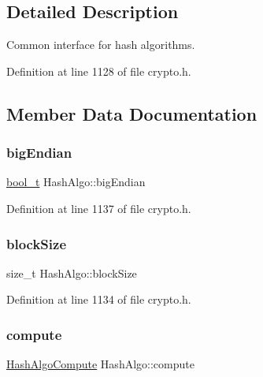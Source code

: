 \subsection{Detailed Description}
Common interface for hash algorithms. 

Definition at line 1128 of file crypto.\+h.



\subsection{Member Data Documentation}
\mbox{\label{structHashAlgo_ad3de1766a80c361da014a824c9b06d14}} 
\subsubsection{\texorpdfstring{big\+Endian}{bigEndian}}
{\footnotesize\ttfamily \hyperlink{compiler__port_8h_a812d16e5494522586b3784e55d479912}{bool\+\_\+t} Hash\+Algo\+::big\+Endian}



Definition at line 1137 of file crypto.\+h.

\mbox{\label{structHashAlgo_a4157d353a7950634666f9abdc2e35a66}} 
\subsubsection{\texorpdfstring{block\+Size}{blockSize}}
{\footnotesize\ttfamily size\+\_\+t Hash\+Algo\+::block\+Size}



Definition at line 1134 of file crypto.\+h.

\mbox{\label{structHashAlgo_af06e5499992d76f215cc8329a2d6cbb3}} 
\subsubsection{\texorpdfstring{compute}{compute}}
{\footnotesize\ttfamily \hyperlink{cyclone__crypto_2core_2crypto_8h_a02fe893af436f6d8a574897a59748592}{Hash\+Algo\+Compute} Hash\+Algo\+::compute}



